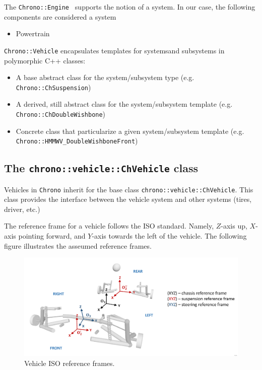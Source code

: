 The \lstinline{Chrono::Engine } supports the notion of a system. In our case, the following components are considered a system

\begin{itemize}
\item Powertrain
\end{itemize}

\lstinline{Chrono::Vehicle} encapsulates templates for systemsand subsystems in polymorphic C++ classes:

\begin{itemize}
\item A base abstract class for the system/subsystem type (e.g. \lstinline{Chrono::ChSuspension})
\item A derived, still abstract class for the system/subsystem template (e.g.  \lstinline{Chrono::ChDoubleWishbone})
\item Concrete class that particularize a given system/subsystem template (e.g. \lstinline{Chrono::HMMWV_DoubleWishboneFront})
\end{itemize}

\subsection{The \lstinline{chrono::vehicle::ChVehicle} class}

Vehicles in \lstinline{Chrono} inherit for the base class \lstinline{chrono::vehicle::ChVehicle}. 
This class provides the interface between the vehicle system and other systems (tires, driver, etc.)

The reference frame for a vehicle follows the ISO standard. 
Namely, $Z$-axis up, $X$-axis pointing forward, and $Y$-axis towards the left of the vehicle. The following figure illustrates
the asseumed reference frames.


\begin{figure}[!htb]
\begin{center}
\includegraphics[scale=0.290]{img/vehicle_iso_ref_frame.jpeg}
\end{center}
\caption{Vehicle ISO reference frames.}
\label{vehicle_iso_ref_frame}
\end{figure}

